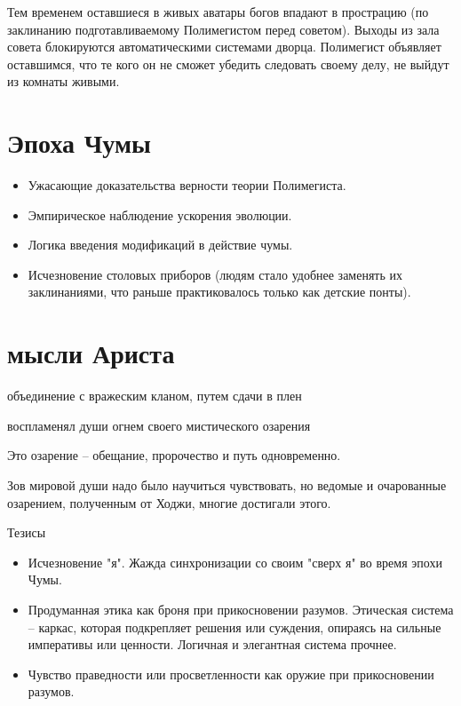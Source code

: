 \documentclass[12pt,a4paper]{article}
\newenvironment{meta}{
\begin{tcolorbox}[breakable, colback=lightgray, colframe=gray]
}{
\end{tcolorbox}
}
\begin{document}
Тем временем оставшиеся в живых аватары богов впадают в прострацию (по заклинанию подготавливаемому Полимегистом перед советом). Выходы из зала совета блокируются автоматическими системами дворца. Полимегист объявляет оставшимся, что те кого он не сможет убедить следовать своему делу, не выйдут из комнаты живыми.


\section*{Эпоха Чумы}
\begin{meta}
\begin{itemize}
	\item Ужасающие доказательства верности теории Полимегиста.
	\item Эмпирическое наблюдение ускорения эволюции.
	\item Логика введения модификаций в действие чумы.
	\item Исчезновение столовых приборов (людям стало удобнее заменять их заклинаниями, что раньше практиковалось только как детские понты).
\end{itemize}
\end{meta}

\section*{мысли Ариста}

\begin{meta}
объединение с вражеским кланом, путем сдачи в плен

воспламенял души огнем своего мистического озарения

Это озарение -- обещание, пророчество и путь одновременно.

Зов мировой души надо было научиться чувствовать, но ведомые и очарованные озарением, полученным от Ходжи, многие достигали этого.

Тезисы
\begin{itemize}
	\item Исчезновение "я". Жажда синхронизации со своим "сверх я" во время эпохи Чумы.
	\item Продуманная этика как броня при прикосновении разумов. Этическая система -- каркас, которая подкрепляет решения или суждения, опираясь на сильные императивы или ценности. Логичная и элегантная система прочнее.
	\item Чувство праведности или просветленности как оружие при прикосновении разумов.
\end{itemize}
\end{meta}
\end{document}
